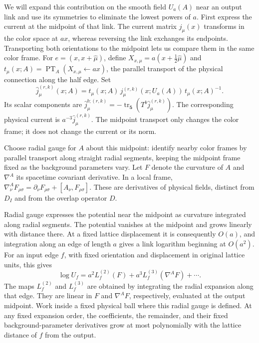 \documentclass[11pt,a4paper]{article}
\theoremstyle{remark}
\DeclareMathOperator{\tr}{tr}
\begin{document}
We will expand this contribution on the smooth field $U_a(A)$ near an
output link and use its symmetries to eliminate the lowest powers of
$a$. First express the current at the midpoint of that link. The
current matrix $j_\mu(x)$ transforms in the color space at $ax$,
whereas reversing the link exchanges its endpoints. Transporting both
orientations to the midpoint lets us compare them in the same color
frame. For $e=(x,x+\hat\mu)$, define
$X_{x,\mu}=a(x+\tfrac12\hat\mu)$ and
$t_\mu(x;A)=\operatorname{PT}_A(X_{x,\mu}\leftarrow ax)$, the
parallel transport of the physical connection along the half edge. Set
\begin{equation}
 \widehat j_\mu^{(r,k)}(x;A)
   =t_\mu(x;A)\,j_\mu^{(r,k)}(x;U_a(A))\,t_\mu(x;A)^{-1}.
\end{equation}
Its scalar components are
$\widehat j_\mu^{b;(r,k)}=-\tr_{\mathbf5}(T^b\widehat
j_\mu^{(r,k)})$. The corresponding physical current is
$a^{-3}\widehat j_\mu^{(r,k)}$. The midpoint transport only changes
the color frame; it does not change the current or its norm.

Choose radial gauge for $A$ about this midpoint: identify nearby color
frames by parallel transport along straight radial segments, keeping the
midpoint frame fixed as the background parameters vary. Let $F$ denote
the curvature of $A$ and $\nabla^A$ its spacetime covariant derivative.
In a local frame,
$\nabla_\nu^A F_{\rho\sigma}
=\partial_\nu F_{\rho\sigma}+[A_\nu,F_{\rho\sigma}]$.
These are derivatives of physical fields, distinct from $D_I$ and from
the overlap operator $D$.

Radial gauge expresses the potential near the midpoint as curvature
integrated along radial segments. The potential vanishes at the
midpoint and grows linearly with distance there. At a fixed lattice
displacement it is consequently $O(a)$, and integration along an edge
of length $a$ gives a link logarithm beginning at $O(a^2)$.
For an input edge $f$, with fixed orientation and displacement in
original lattice units, this gives
\begin{equation}
 \log U_f=a^2L_f^{(2)}(F)
              +a^3L_f^{(3)}(\nabla^A F)+\cdots .
 \label{phys:true-input}
\end{equation}
The maps $L_f^{(2)}$ and $L_f^{(3)}$ are obtained by integrating the
radial expansion along that edge. They are linear in $F$ and
$\nabla^A F$, respectively, evaluated at the output midpoint. Work
inside a fixed physical ball where this radial gauge is defined. At
any fixed expansion order, the coefficients, the remainder, and their
fixed background-parameter derivatives grow at most polynomially with
the lattice distance of $f$ from the output.
\end{document}
